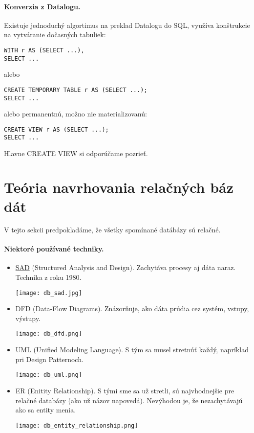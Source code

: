 \documentclass[10pt,a4paper]{article}
\begin{document}
\paragraph{Konverzia z Datalogu.}
Existuje jednoduchý algortimus na preklad Datalogu do SQL,
využíva konštrukcie na vytváranie dočasných tabuliek: 
\begin{verbatim}
WITH r AS (SELECT ...),
SELECT ...
\end{verbatim} 
alebo
\begin{verbatim}
CREATE TEMPORARY TABLE r AS (SELECT ...);
SELECT ...
\end{verbatim}
alebo permanentnú, možno nie materializovanú: 
\begin{verbatim}
CREATE VIEW r AS (SELECT ...);
SELECT ...
\end{verbatim}

Hlavne CREATE VIEW si odporúčame pozrieť. 

\section{Teória navrhovania relačných báz dát} 

V tejto sekcii predpokladáme, že všetky spomínané datábázy sú relačné. 

\paragraph{Niektoré používané techniky.}
\begin{itemize}
\item \href{http://en.wikipedia.org/wiki/Structured_analysis}{SAD} (Structured Analysis and Design). Zachytáva procesy aj dáta naraz. Technika z roku 1980.
\begin{center}
\texttt{[image: db\_sad.jpg]}
\end{center}
\item DFD (Data-Flow Diagrams). Znázorňuje, ako dáta prúdia cez systém, vstupy, výstupy. 
\begin{center}
\texttt{[image: db\_dfd.png]}
\end{center}
\item UML (Unified Modeling Language). S tým sa musel stretnúť každý, napríklad pri Design Patternoch. 
\begin{center}
\texttt{[image: db\_uml.png]}
\end{center}
\item ER (Enitity Relationship). S tými sme sa už stretli, sú najvhodnejšie pre relačné databázy (ako už názov napovedá). Nevýhodou je, že nezachytávajú ako sa entity menia. 
\begin{center}
\texttt{[image: db\_entity\_relationship.png]}
\end{center}
\end{itemize}
\end{document}

